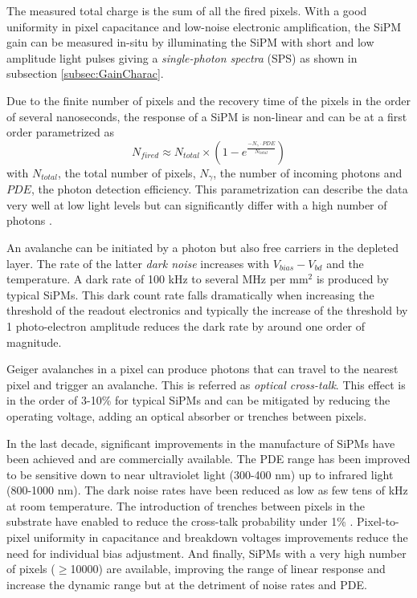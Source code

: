 The measured total charge is the sum of all the fired pixels. With a good uniformity in pixel capacitance and low-noise electronic amplification, the SiPM gain can be measured in-situ by illuminating the SiPM with short and low amplitude light pulses giving a \textit{single-photon spectra} (SPS) as shown in subsection \ref{subsec:GainCharac}.

Due to the finite number of pixels and the recovery time of the pixels in the order of several nanoseconds, the response of a SiPM is non-linear and can be at a first order parametrized as
\begin{equation}
  N_{fired} \approx N_{total} \times (1 - e^{\frac{- N_{\gamma} \cdot PDE}{N_{total}}})
\end{equation}
with $N_{total}$, the total number of pixels, $N_{\gamma}$, the number of incoming photons and $PDE$, the photon detection efficiency. This parametrization can describe the data very well at low light levels but can significantly differ with a high number of photons \cite{Kotera:2015rha}.

An avalanche can be initiated by a photon but also free carriers in the depleted layer. The rate of the latter \textit{dark noise} increases with $V_{bias} - V_{bd}$ and the temperature. A dark rate of 100 kHz to several MHz per mm$^2$ is produced by typical SiPMs. This dark count rate falls dramatically when increasing the threshold of the readout electronics and typically the increase of the threshold by 1 photo-electron amplitude reduces the dark rate by around one order of magnitude.

Geiger avalanches in a pixel can produce photons that can travel to the nearest pixel and trigger an avalanche. This is referred as \textit{optical cross-talk}. This effect is in the order of 3-10\% for typical SiPMs and can be mitigated by reducing the operating voltage, adding an optical absorber or trenches between pixels.

In the last decade, significant improvements in the manufacture of SiPMs have been achieved and are commercially available. The PDE range has been improved to be sensitive down to near ultraviolet light (300-400 nm) up to infrared light (800-1000 nm). The dark noise rates have been reduced as low as few tens of kHz at room temperature. The introduction of trenches between pixels in the substrate have enabled to reduce the cross-talk probability under 1\% \cite{Liu:2015cpe}. Pixel-to-pixel uniformity in capacitance and breakdown voltages improvements reduce the need for individual bias adjustment. And finally, SiPMs with a very high number of pixels ($\geq$10000) are available, improving the range of linear response and increase the dynamic range but at the detriment of noise rates and PDE.

